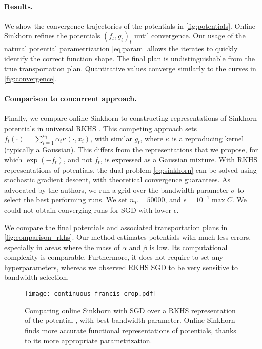 \paragraph{Results.} We show the convergence trajectories of the potentials in
\autoref{fig:potentials}. Online Sinkhorn refines the potentials $(f_t, g_t)_t$ until convergence. Our usage of the natural potential parametrization \eqref{eq:param}
allows the iterates to quickly identify the correct function shape. The final
plan is undistinguishable from the true transportation plan. Quantitative values
converge similarly to the curves in \autoref{fig:convergence}.

\paragraph{Comparison to concurrent approach.} Finally, we compare online
Sinkhorn to constructing representations of Sinkhorn potentials in universal
RKHS \cite{2016-genevay-nips}. This competing approach sets $f_t(\cdot) =
\sum_{i=1}^{n_t} \alpha_t \kappa(\cdot, x_i)$, with similar $g_t$, where $\kappa$ is
a reproducing kernel (typically a Gaussian). This differs from the
representations that we propose, for which $\exp(-f_t)$, and not $f_t$, is
expressed as a Gaussian mixture. With RKHS representations of potentials, the
dual problem \eqref{eq:sinkhorn} can be solved using stochastic gradient
descent, with theoretical convergence guarantees. As advocated by the authors,
we run a grid over the bandwidth parameter $\sigma$ to select the best
performing runs. We set $n_T = 50000$, and $\epsilon = 10^{-1} \max C$. We could not obtain converging runs for SGD with lower $\epsilon$.

We compare the final potentials and associated
transportation plans in \autoref{fig:comparison_rkhs}. Our method estimates
potentials with much less errors, especially in areas where the mass of $\alpha$
and $\beta$ is low. Its computational complexity is comparable. Furthermore, it
does not require to set any hyperparameters, whereas we observed RKHS SGD to be
very sensitive to bandwidth selection.

\begin{figure}[t]
    \centering
    \texttt{[image: continuous\_francis-crop.pdf]}
    \caption{Comparing online Sinkhorn with SGD over a RKHS representation of the potential \citep{2016-genevay-nips}, with best bandwidth parameter. Online Sinkhorn finds more accurate functional representations of potentials, thanks to its more appropriate parametrization.}
    \label{fig:comparison_rkhs}
\end{figure}